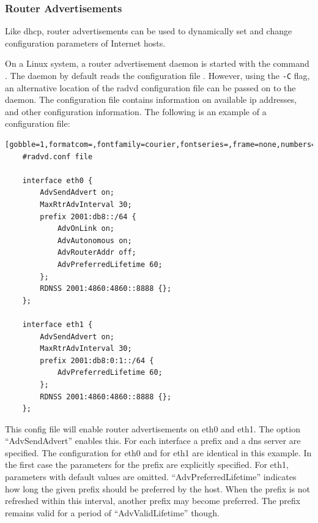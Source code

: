\subsubsection{Router Advertisements}

Like \acs{dhcp}, router advertisements can be used to dynamically set and change configuration parameters of Internet hosts. 

On a Linux system, a router advertisement daemon is started with the command . The daemon by default reads the configuration file . However, using the \texttt{-C}  flag, an alternative location of the radvd configuration file can be passed on to the daemon. The configuration file contains information on available \acs{ip} addresses, and other configuration information. The following is an example of a configuration file:
\begin{framed}
\begin{Verbatim}[gobble=1,formatcom=,fontfamily=courier,fontseries=,frame=none,numbers=none]
	#radvd.conf file
	
	interface eth0 {
		AdvSendAdvert on;
		MaxRtrAdvInterval 30;
		prefix 2001:db8::/64 {
			AdvOnLink on;
			AdvAutonomous on;
			AdvRouterAddr off;
			AdvPreferredLifetime 60;
		};
		RDNSS 2001:4860:4860::8888 {};
	};
	
	interface eth1 {
		AdvSendAdvert on;
		MaxRtrAdvInterval 30;
		prefix 2001:db8:0:1::/64 {
			AdvPreferredLifetime 60;
		};
		RDNSS 2001:4860:4860::8888 {};
	};
\end{Verbatim}
\end{framed}

This config file will enable router advertisements on eth0 and eth1. The option ``AdvSendAdvert'' enables this. For each interface a prefix and a \acs{dns} server are specified. The configuration for eth0 and for eth1 are identical in this example. In the first case the parameters for the prefix are explicitly specified. For eth1, parameters with default values are omitted. ``AdvPreferredLifetime'' indicates how long the given prefix should be preferred by the host. When the prefix is not refreshed within this interval, another prefix may become preferred. The prefix remains valid for a period of ``AdvValidLifetime'' though.

